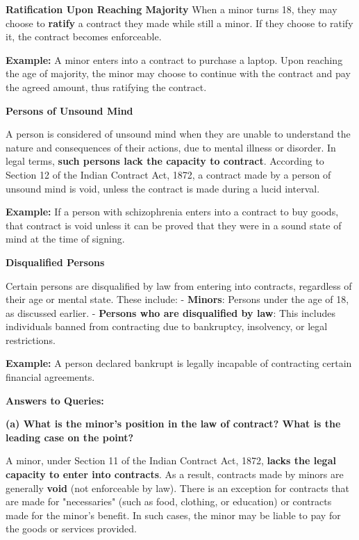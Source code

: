 \documentclass[12pt,a4paper]{book}
\begin{document}
\vspace{0.3cm}

\textbf{Ratification Upon Reaching Majority}  
When a minor turns 18, they may choose to \textbf{ratify} a contract they made while still a minor. If they choose to ratify it, the contract becomes enforceable.

\textbf{Example:}  
A minor enters into a contract to purchase a laptop. Upon reaching the age of majority, the minor may choose to continue with the contract and pay the agreed amount, thus ratifying the contract.

\vspace{1cm}


\textbf{Persons of Unsound Mind}  

A person is considered of unsound mind when they are unable to understand the nature and consequences of their actions, due to mental illness or disorder. In legal terms, \textbf{such persons lack the capacity to contract}. According to Section 12 of the Indian Contract Act, 1872, a contract made by a person of unsound mind is void, unless the contract is made during a lucid interval.

\textbf{Example:}  
If a person with schizophrenia enters into a contract to buy goods, that contract is void unless it can be proved that they were in a sound state of mind at the time of signing.

\vspace{0.5cm}

\textbf{Disqualified Persons}  

Certain persons are disqualified by law from entering into contracts, regardless of their age or mental state. These include:
- \textbf{Minors}: Persons under the age of 18, as discussed earlier.
- \textbf{Persons who are disqualified by law}: This includes individuals banned from contracting due to bankruptcy, insolvency, or legal restrictions.

\textbf{Example:}  
A person declared bankrupt is legally incapable of contracting certain financial agreements.

\vspace{0.5cm}

\textbf{Answers to Queries:}

\textbf{(a) What is the minor's position in the law of contract? What is the leading case on the point?}

A minor, under Section 11 of the Indian Contract Act, 1872, \textbf{lacks the legal capacity to enter into contracts}. As a result, contracts made by minors are generally \textbf{void} (not enforceable by law). There is an exception for contracts that are made for "necessaries" (such as food, clothing, or education) or contracts made for the minor’s benefit. In such cases, the minor may be liable to pay for the goods or services provided.
\end{document}
